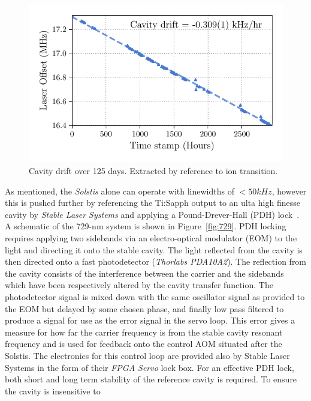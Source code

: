     \begin{figure}
        \begin{center}
        \noindent\includegraphics[width=0.75\linewidth]{
            figures/pdf_figure/cavity_drift.pdf
            }
        \end{center}
        \caption{
            Cavity drift over 125 days. Extracted by reference to ion transition.
            }
        \label{fig:Cavity Drift}
    \end{figure}
    As mentioned, the \emph{Solstis} alone can operate with linewidths of
    $<50kHz$, however this is pushed further by referencing the Ti:Sapph output
    to an ulta high finesse cavity by \emph{Stable Laser Systems} and applying
    a Pound-Drever-Hall (PDH) lock~\cite{}.  A schematic of the 729-nm system is
    shown in Figure~\ref{fig:729}.  PDH locking requires applying two sidebands
    via an electro-optical modulator (EOM) to the light and directing it onto
    the stable cavity. The light reflected from the cavity is then directed onto
    a fast photodetector (\emph{Thorlabs PDA10A2}). The reflection from the
    cavity consists of the interference between the carrier and the sidebands
    which have been respectively altered by the cavity transfer function. The
    photodetector signal is mixed down with the same oscillator signal as
    provided to the EOM but delayed by some chosen phase, and finally low pass
    filtered to produce a signal for use as the error signal in the servo loop.
    This error gives a measure for how far the carrier frequency is from the
    stable cavity resonant frequency and is used for feedback onto the control
    AOM situated after the Solstis. The electronics for this control loop are
    provided also by Stable Laser Systems in the form of their \emph{FPGA Servo}
    lock box. For an effective PDH lock, both short and long term
    stability of the reference cavity is required. To ensure the cavity is insensitive to
